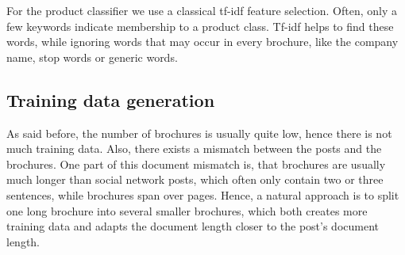 For the product classifier we use a classical tf-idf\cite{sparck1972statistical} feature selection.
Often, only a few keywords indicate membership to a product class.
Tf-idf helps to find these words, while ignoring words that may occur in every brochure, like the company name, stop words or generic words.


\subsection{Training data generation}

As said before, the number of brochures is usually quite low, hence there is not much training data.
Also, there exists a mismatch between the posts and the brochures.
One part of this document mismatch is, that brochures are usually much longer than social network posts, which often only contain two or three sentences, while brochures span over pages.
Hence, a natural approach is to split one long brochure into several smaller brochures, which both creates more training data and adapts the document length closer to the post's document length.
